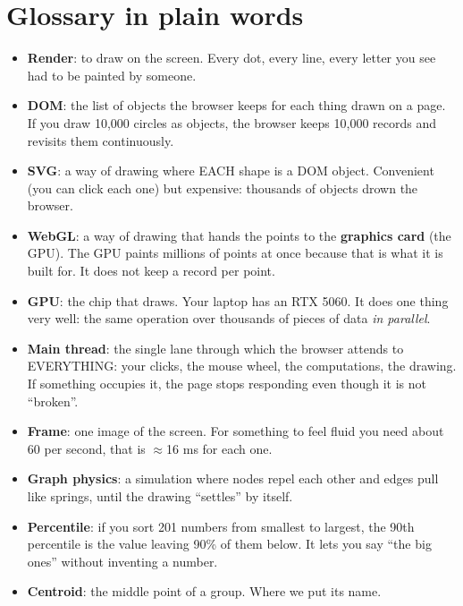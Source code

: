 \documentclass[11pt,a4paper]{article}
\begin{document}

\section{Glossary in plain words}

\begin{itemize}
  \item \textbf{Render}: to draw on the screen. Every dot, every line, every letter you see had
        to be painted by someone.
  \item \textbf{DOM}: the list of objects the browser keeps for each thing drawn on a page. If
        you draw 10,000 circles as objects, the browser keeps 10,000 records and revisits them
        continuously.
  \item \textbf{SVG}: a way of drawing where EACH shape is a DOM object. Convenient (you can
        click each one) but expensive: thousands of objects drown the browser.
  \item \textbf{WebGL}: a way of drawing that hands the points to the \textbf{graphics card}
        (the GPU). The GPU paints millions of points at once because that is what it is built
        for. It does not keep a record per point.
  \item \textbf{GPU}: the chip that draws. Your laptop has an RTX 5060. It does one thing very
        well: the same operation over thousands of pieces of data \emph{in parallel}.
  \item \textbf{Main thread}: the single lane through which the browser attends to EVERYTHING:
        your clicks, the mouse wheel, the computations, the drawing. If something occupies it,
        the page stops responding even though it is not ``broken''.
  \item \textbf{Frame}: one image of the screen. For something to feel fluid you need about 60
        per second, that is $\approx$16 ms for each one.
  \item \textbf{Graph physics}: a simulation where nodes repel each other and edges pull like
        springs, until the drawing ``settles'' by itself.
  \item \textbf{Percentile}: if you sort 201 numbers from smallest to largest, the 90th
        percentile is the value leaving 90\% of them below. It lets you say ``the big ones''
        without inventing a number.
  \item \textbf{Centroid}: the middle point of a group. Where we put its name.
\end{itemize}
\end{document}
